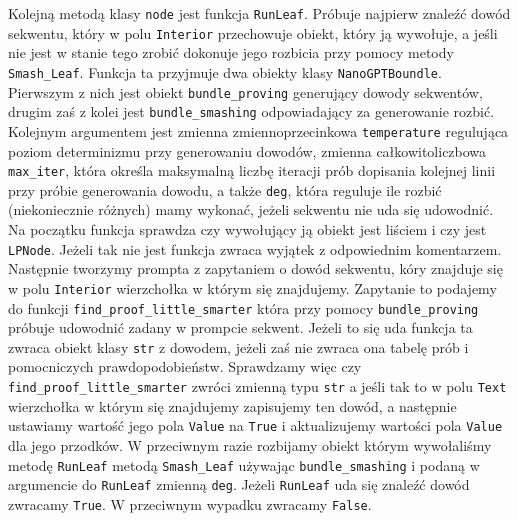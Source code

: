 \documentclass{article}
\begin{document}
Kolejną metodą klasy \texttt{node} jest funkcja \texttt{RunLeaf}. Próbuje najpierw znaleźć dowód sekwentu, który w polu \texttt{Interior} przechowuje obiekt, który ją wywołuje, a jeśli nie jest w stanie tego zrobić dokonuje jego rozbicia przy pomocy metody \texttt{Smash\_Leaf}. Funkcja ta przyjmuje dwa obiekty klasy \texttt{NanoGPTBoundle}. Pierwszym z nich jest obiekt \texttt{bundle\_proving} generujący dowody sekwentów, drugim zaś z kolei jest
 \texttt{bundle\_smashing}
odpowiadający za generowanie rozbić. Kolejnym argumentem jest zmienna zmiennoprzecinkowa \texttt{temperature} regulująca poziom determinizmu przy generowaniu dowodów, zmienna całkowitoliczbowa \texttt{max\_iter}, która określa maksymalną liczbę iteracji prób dopisania kolejnej linii przy próbie generowania dowodu, a także \texttt{deg}, która reguluje ile rozbić (niekoniecznie różnych) mamy wykonać, jeżeli sekwentu nie uda się udowodnić. Na początku funkcja sprawdza czy wywołujący ją obiekt jest liściem i czy jest \texttt{LPNode}. Jeżeli tak nie jest funkcja zwraca wyjątek z odpowiednim komentarzem.  Następnie  tworzymy prompta z zapytaniem o dowód sekwentu, kóry znajduje się w polu \texttt{Interior} wierzchołka w którym się znajdujemy. Zapytanie to podajemy do funkcji \texttt{find\_proof\_little\_smarter} która przy pomocy \texttt{bundle\_proving} próbuje udowodnić zadany w prompcie sekwent. Jeżeli to się uda funkcja ta zwraca obiekt klasy \texttt{str} z dowodem, jeżeli zaś nie zwraca ona tabelę prób i pomocniczych prawdopodobieństw. Sprawdzamy więc czy \texttt{find\_proof\_little\_smarter} zwróci zmienną typu \texttt{str} a jeśli tak to w polu \texttt{Text} wierzchołka w którym się znajdujemy zapisujemy ten dowód, a następnie ustawiamy wartość jego pola \texttt{Value} na \texttt{True} i aktualizujemy wartości pola \texttt{Value} dla jego przodków. W przeciwnym razie rozbijamy obiekt którym wywołaliśmy metodę \texttt{RunLeaf} metodą \texttt{Smash\_Leaf} używając \texttt{bundle\_smashing} i podaną w argumencie do \texttt{RunLeaf} zmienną \texttt{deg}. Jeżeli \texttt{RunLeaf} uda się znaleźć dowód zwracamy \texttt{True}. W przeciwnym wypadku zwracamy \texttt{False}.
\end{document}
